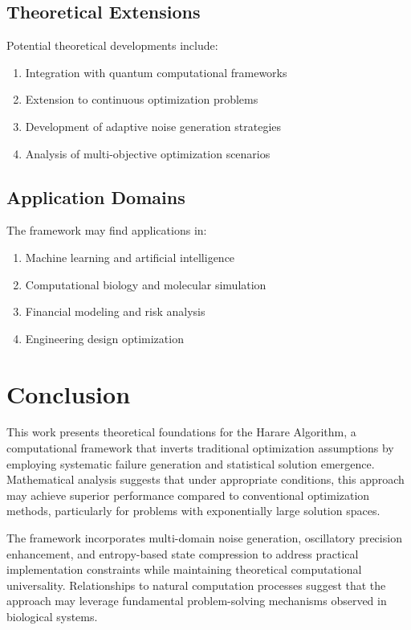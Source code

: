 \documentclass[11pt,a4paper]{article}
\theoremstyle{remark}
\begin{document}
\subsection{Theoretical Extensions}

Potential theoretical developments include:
\begin{enumerate}
\item Integration with quantum computational frameworks
\item Extension to continuous optimization problems
\item Development of adaptive noise generation strategies
\item Analysis of multi-objective optimization scenarios
\end{enumerate}

\subsection{Application Domains}

The framework may find applications in:
\begin{enumerate}
\item Machine learning and artificial intelligence
\item Computational biology and molecular simulation
\item Financial modeling and risk analysis
\item Engineering design optimization
\end{enumerate}

\section{Conclusion}

This work presents theoretical foundations for the Harare Algorithm, a computational framework that inverts traditional optimization assumptions by employing systematic failure generation and statistical solution emergence. Mathematical analysis suggests that under appropriate conditions, this approach may achieve superior performance compared to conventional optimization methods, particularly for problems with exponentially large solution spaces.

The framework incorporates multi-domain noise generation, oscillatory precision enhancement, and entropy-based state compression to address practical implementation constraints while maintaining theoretical computational universality. Relationships to natural computation processes suggest that the approach may leverage fundamental problem-solving mechanisms observed in biological systems.
\end{document}
